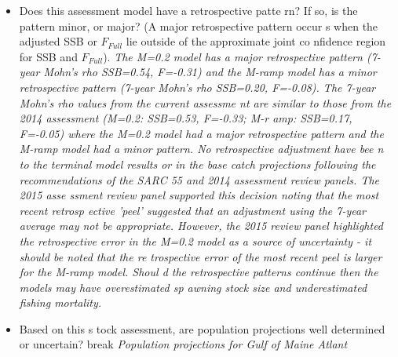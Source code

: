 {\begin{itemize}{}
f uncertainty in this stock assessment? Explain, and describe qualitatively how
 they affect the assessment results (such as estimates of biomass, F, recruitme
nt, and population projections). \linebreak{} \hspace*{0.5cm} \textit{The large
st source of uncertainty is the estimate of natural mortality. Past investigati
ons into changes in natural mortality over time have been inconclusive (NEFSC 2
013). Different assumptions about natural mortality affect the scale of the bio
mass, recruitment, and fishing mortality estimates. Other areas of uncertainty 
include the retrospective error in the M=0.2 model, residual patterns in the mo
del fits to some of the survey series (e.g., aggregate MADMF spring survey) and
 stock structure.} \item{}Does this assessment model have a retrospective patte
rn? If so, is the pattern minor, or major? (A major retrospective pattern occur
s when the adjusted SSB or $F_{Full}${} lie outside of the approximate joint co
nfidence region for SSB and $F_{Full}${}). \linebreak{} \hspace*{0.5cm} \textit
{The M=0.2 model has a major retrospective pattern (7-year Mohn's rho SSB=0.54,
 F=-0.31) and the M-ramp model has a minor retrospective pattern (7-year Mohn's
 rho SSB=0.20, F=-0.08). The 7-year Mohn's rho values from the current assessme
nt are similar to those from the 2014 assessment (M=0.2: SSB=0.53, F=-0.33; M-r
amp: SSB=0.17, F=-0.05) where the M=0.2 model had a major retrospective pattern
 and the M-ramp model had a minor pattern. No retrospective adjustment have bee
n to the terminal model results or in the base catch projections following the 
recommendations of the SARC 55 and 2014 assessment review panels. The 2015 asse
ssment review panel supported this decision noting that the most recent retrosp
ective 'peel' suggested that an adjustment using the 7-year average may not be 
appropriate. However, the 2015 review panel highlighted the retrospective error
 in the M=0.2 model as a source of uncertainty - it should be noted that the re
trospective error of the most recent peel is larger for the M-ramp model. Shoul
d the retrospective patterns continue then the models may have overestimated sp
awning stock size and underestimated fishing mortality.} \item{}Based on this s
tock assessment, are population projections well determined or uncertain? \line
break{} \hspace*{0.5cm} \textit{Population projections for Gulf of Maine Atlant
}
\end{itemize}}
